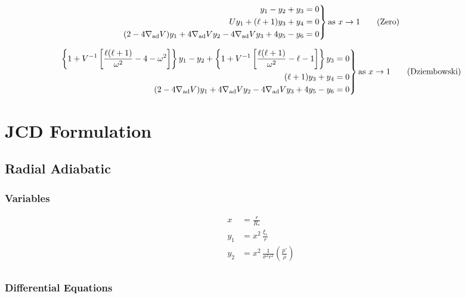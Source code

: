 \documentclass[fleqn]{article}
\newcommand{\nabad}{\ensuremath{\nabla_{\rm ad}}}
\newcommand{\Rstar}{\ensuremath{R_{\ast}}}
\begin{document}
\begin{equation*}
\left.
\begin{aligned}
y_{1} - y_{2} + y_{3} &= 0 \\
U y_{1} + (\ell + 1) y_{3} + y_{4} &= 0 \\
(2 - 4\nabad V) y_{1} + 4 \nabad V y_{2} - 4 \nabad V y_{3} + 4 y_{5} - y_{6} &= 0
\end{aligned}
\right\}
\text{as}\ x \rightarrow 1 \qquad \text{(Zero)}
\end{equation*}

\begin{equation*}
\left.
\begin{aligned}
\left\{ 1 + V^{-1} \left[ \frac{\ell(\ell+1)}{\omega^{2}} - 4 - \omega^{2} \right] \right\} y_{1} -
y_{2} +
\left\{ 1 + V^{-1} \left[ \frac{\ell(\ell+1)}{\omega^{2}} - \ell - 1 \right] \right\} y_{3} &= 0 \\
(\ell + 1) y_{3} + y_{4} &= 0 \\
(2 - 4\nabad V) y_{1} + 4 \nabad V y_{2} - 4 \nabad V y_{3} + 4 y_{5} - y_{6} &= 0
\end{aligned}
\right\}
\text{as}\ x \rightarrow 1 \qquad \text{(Dziembowski)}
\end{equation*}


\newpage

\section*{JCD Formulation}

\subsection*{Radial Adiabatic}

\subsubsection*{Variables}

\begin{align*}
x     &= \frac{r}{\Rstar} \\
y_{1} &= x^{2}\, \frac{\xi_{r}}{r} \\
y_{2} &= x^{2}\, \frac{1}{\sigma^{2} r^{2}} \left( \frac{p'}{\rho} \right) \\
\end{align*}

\subsubsection*{Differential Equations}
\end{document}
